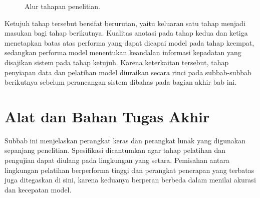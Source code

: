 \begin{figure}[h]
    \centering
    \caption{Alur tahapan penelitian.}
    \label{fig:alur_penelitian}
\end{figure}

Ketujuh tahap tersebut bersifat berurutan, yaitu keluaran satu tahap menjadi
masukan bagi tahap berikutnya. Kualitas anotasi pada tahap kedua dan ketiga menetapkan
batas atas performa yang dapat dicapai model pada tahap keempat, sedangkan performa
model menentukan keandalan informasi kepadatan yang disajikan sistem pada tahap
ketujuh. Karena keterkaitan tersebut, tahap penyiapan data dan pelatihan model diuraikan
secara rinci pada subbab-subbab berikutnya sebelum perancangan sistem dibahas pada
bagian akhir bab ini.

\section{Alat dan Bahan Tugas Akhir}
\label{sec:alat_bahan}

Subbab ini menjelaskan perangkat keras dan perangkat lunak yang digunakan sepanjang 
penelitian. Spesifikasi dicantumkan agar tahap pelatihan dan pengujian dapat diulang 
pada lingkungan yang setara. Pemisahan antara lingkungan pelatihan berperforma tinggi dan 
perangkat penerapan yang terbatas juga ditegaskan di sini, karena keduanya berperan berbeda 
dalam menilai akurasi dan kecepatan model.

